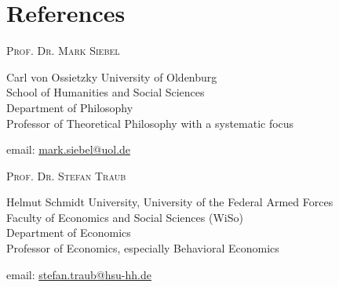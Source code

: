 \documentclass[a4paper,10pt]{article}
\begin{document}
\clearpage
\section{References}
\textsc{Prof\hspace{0.5pt}. Dr\hspace{0.5pt}. Mark Siebel}

Carl von Ossietzky University of Oldenburg\\
School of Humanities and Social Sciences\\
Department of Philosophy\\
Professor of Theoretical Philosophy with a systematic focus

email: \href{mailto:mark.siebel@uol.de}{mark.siebel@uol.de}\vspace{12pt}

\textsc{Prof\hspace{0.5pt}. Dr\hspace{0.5pt}. Stefan Traub}

Helmut Schmidt University, University of the Federal Armed Forces\\
Faculty of Economics and Social Sciences (WiSo)\\
Department of Economics\\
Professor of Economics, especially Behavioral Economics

email: \href{mailto:stefan.traub@hsu-hh.de}{stefan.traub@hsu-hh.de}
\end{document}
